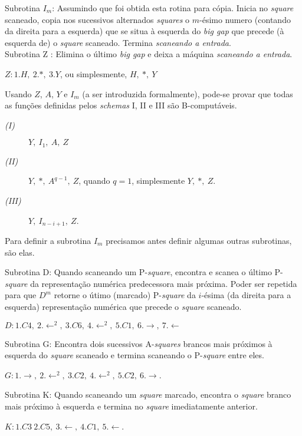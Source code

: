 \documentclass[10pt,letterpaper]{article}
\begin{document}
Subrotina $I_m$: Assumindo que foi obtida esta rotina para c\'opia. Inicia no \textit{square} scaneado, copia nos sucessivos alternados \textit{squares} o $m$-\'esimo numero (contando da direita para a esquerda) que se situa \`a esquerda do \textit{big gap} que precede (\`a esquerda de) o \textit{square} scaneado. Termina \textit{scaneando a entrada}.\\

Subrotina Z : Elimina o \'ultimo \textit{big gap} e deixa a m\'aquina \textit{scaneando a entrada}.
\begin{center}$Z: 1.H,\ 2.*,\ 3.Y$, ou simplesmente, $H,\ *,\ Y$
\end{center}

Usando $Z$, $A$, $Y$ e $I_m$ (a ser introduzida formalmente), pode-se provar que todas as fun\c{c}\~{o}es definidas pelos \textit{schemas} I, II e III s\~{a}o B-comput\'aveis.
\begin{description}
\item[\textit{(I)}] $Y,\ I_1,\ A,\ Z$
\item[\textit{(II)}] $Y,\ *,\ A^{q-1},\ Z$, quando $q = 1$, simplesmente $Y,\ *,\ Z$.
\item[\textit{(III)}] $Y,\ I_{n-i+1},\ Z$.
\end{description}

Para definir a subrotina $I_m$ precisamos antes definir algumas outras subrotinas, s\~{a}o elas.

Subrotina D: Quando scaneando um P-\textit{square}, encontra e scanea o \'ultimo P-\textit{square} da representa\c{c}\~{a}o num\'erica predecessora mais pr\'oxima. Poder ser repetida para que $D^m$ retorne o \'utimo (marcado) P-\textit{square} da $i$-\'esima (da direita para a esquerda) representa\c{c}\~{a}o num\'erica que precede o \textit{square} scaneado.
\begin{center}
$D: 1.C4,\ 2.\leftarrow^2,\ 3.C6,\ 4.\leftarrow^2,\ 5.C1,\ 6.\rightarrow,\ 7.\leftarrow$
\end{center}

Subrotina G: Encontra dois sucessivos A-\textit{squares} brancos mais pr\'oximos \`a esquerda do \textit{square} scaneado e termina scaneando o P-\textit{square} entre eles.
\begin{center}
$G: 1.\rightarrow,\ 2.\leftarrow^2,\ 3.C2,\ 4.\leftarrow^2,\ 5.C2,\ 6.\rightarrow$.
\end{center}

Subrotina K: Quando scaneando um \textit{square} marcado, encontra o \textit{square} branco mais pr\'oximo \`a esquerda e termina no \textit{square} imediatamente anterior.
\begin{center}
$K: 1.C3\ 2.C5,\ 3.\leftarrow,\ 4.C1,\ 5.\leftarrow$.
\end{center}
\end{document}
